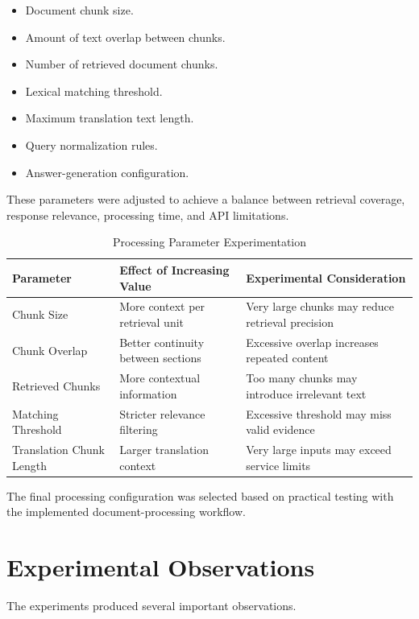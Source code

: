 \begin{itemize}
    \item Document chunk size.
    \item Amount of text overlap between chunks.
    \item Number of retrieved document chunks.
    \item Lexical matching threshold.
    \item Maximum translation text length.
    \item Query normalization rules.
    \item Answer-generation configuration.
\end{itemize}

These parameters were adjusted to achieve a balance between retrieval
coverage, response relevance, processing time, and API limitations.

\begin{table}[H]
\centering
\caption{Processing Parameter Experimentation}
\begin{tabular}{|p{5cm}|p{4cm}|p{4cm}|}
\hline
\textbf{Parameter} & \textbf{Effect of Increasing Value} & \textbf{Experimental Consideration} \\
\hline
Chunk Size & More context per retrieval unit & Very large chunks may reduce retrieval precision \\
\hline
Chunk Overlap & Better continuity between sections & Excessive overlap increases repeated content \\
\hline
Retrieved Chunks & More contextual information & Too many chunks may introduce irrelevant text \\
\hline
Matching Threshold & Stricter relevance filtering & Excessive threshold may miss valid evidence \\
\hline
Translation Chunk Length & Larger translation context & Very large inputs may exceed service limits \\
\hline
\end{tabular}
\end{table}

The final processing configuration was selected based on practical
testing with the implemented document-processing workflow.

\section{Experimental Observations}

The experiments produced several important observations.

